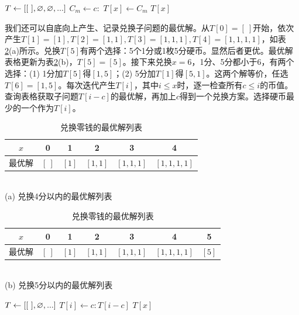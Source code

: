 \documentclass[b5paper]{ctexart}
\begin{document}
\begin{algorithmic}[1]
\State $T \gets [[\ ], \varnothing, \varnothing, ...]$ 
      \State $C_m \gets c :$ 
        \State $T[x] \gets C_m$
      \EndIf
    \EndFor
  \EndIf
  \State \Return $T[x]$
\EndFunction
\end{algorithmic}

我们还可以自底向上产生、记录兑换子问题的最优解。从$T[0] = [\ ]$开始，依次产生$T[1] = [1], T[2] = [1, 1], T[3] = [1, 1, 1], T[4] = [1, 1, 1, 1]$，如表\ref{tab:change-money}(a)所示。兑换$T[5]$有两个选择：5个1分或1枚5分硬币。显然后者更优。最优解表格更新为表\ref{tab:change-money}(b)，$T[5] = [5]$。接下来兑换$x = 6$，1分、5分都小于6，有两个选择：(1) 1分加$T[5]$得$[1, 5]$；(2) 5分加$T[1]$得$[5, 1]$。这两个解等价，任选$T[6] = [1, 5]$。每次迭代产生$T[i]$，其中$i \leq x$时，逐一检查所有$c \leq i$的币值。查询表格获取子问题$T[i-c]$的最优解，再加上$c$得到一个兑换方案。选择硬币最少的一个作为$T[i]$。

\begin{table}[htbp]
\centering
\begin{tabular}{c||c|c|c|c|c|}
\hline
$x$ & 0 & 1 & 2 & 3 & 4 \\
\hline
最优解 & $[\ ]$ & $[1]$ & $[1, 1]$ & $[1, 1, 1]$ & $[1, 1, 1, 1]$ \\
\hline
\end{tabular} \\
(a) 兑换4分以内的最优解列表 \\
\vspace{10pt}
\begin{tabular}{c||c|c|c|c|c|c|}
\hline
$x$ & 0 & 1 & 2 & 3 & 4 & 5 \\
\hline
最优解 & $[\ ]$ & $[1]$ & $[1, 1]$ & $[1, 1, 1]$ & $[1, 1, 1, 1]$ & $[5]$ \\
\hline
\end{tabular} \\
(b) 兑换5分以内的最优解列表 \\
\caption{兑换零钱的最优解列表}
\label{tab:change-money}
\end{table}

\begin{algorithmic}[1]
  \State $T \gets [[\ ], \varnothing, ... ]$
        \State $T[i] \gets  c : T[i-c]$
      \EndIf
    \EndFor
  \EndFor
  \State \Return $T[x]$
\EndFunction
\end{algorithmic}
\end{document}
